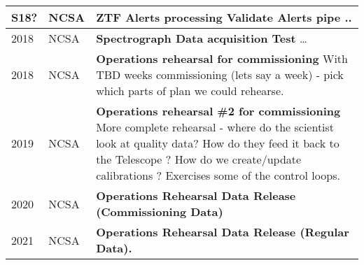 \begin{longtable} {|l|l|p{}|}
S18? & NCSA & {\bf ZTF Alerts processing} \newline
Validate Alerts pipe .. 
\\ \hline

2018 & NCSA & {\bf Spectrograph Data acquisition Test} \newline
\ldots
\\ \hline

2018 &  NCSA & {\bf Operations rehearsal for commissioning }
With TBD weeks commissioning (lets say a week) - pick which parts of plan we could rehearse.
\\ \hline

2019 & NCSA &  {\bf  Operations rehearsal \#2 for commissioning} 
More complete rehearsal - where do the scientist look at quality data? How do they feed it back to the Telescope ?
How do we create/update calibrations ? Exercises some of the control loops.
\\ \hline
\hline
2020 &  NCSA &  {\bf Operations  Rehearsal Data Release (Commissioning Data)}
\\ \hline
2021 &  NCSA &  {\bf Operations  Rehearsal Data Release (Regular Data).}
\\ \hline

\hline

\end{longtable}
